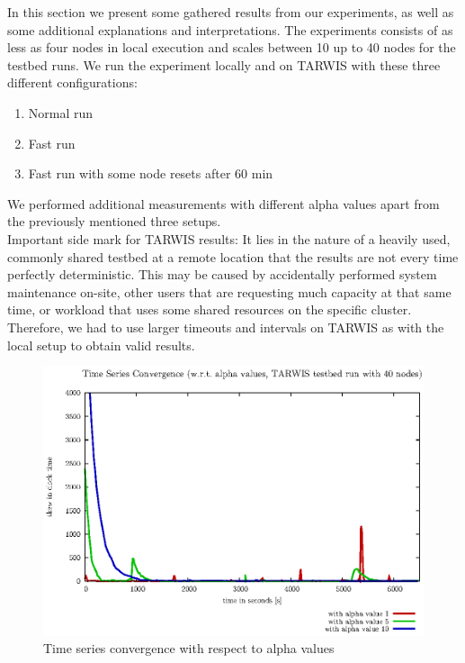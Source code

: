\documentclass{llncs}
\begin{document}
In this section we present some gathered results from our experiments, as well as some additional explanations and interpretations. The experiments consists of as less as four nodes in local execution and scales between 10 up to 40 nodes for the testbed runs. We run the experiment locally and on TARWIS with these three different configurations:
\begin{enumerate}
\item Normal run
\item Fast run
\item Fast run with some node resets after 60 min
\end{enumerate}
We performed additional measurements with different alpha values apart from the previously mentioned three setups.\\
Important side mark for TARWIS results: It lies in the nature of a heavily used, commonly shared testbed at a remote location that the results are not every time perfectly deterministic. This may be caused by accidentally performed system maintenance on-site, other users that are requesting much capacity at that same time, or workload that uses some shared resources on the specific cluster. Therefore, we had to use larger timeouts and intervals on TARWIS as with the local setup to obtain valid results.
\begin{figure}[H]
	\centering
	\includegraphics[scale=0.8]{images/FIG_01.eps}
	\caption{Time series convergence with respect to alpha values}
	\label{fig:alpha}
\end{figure}
\end{document}
